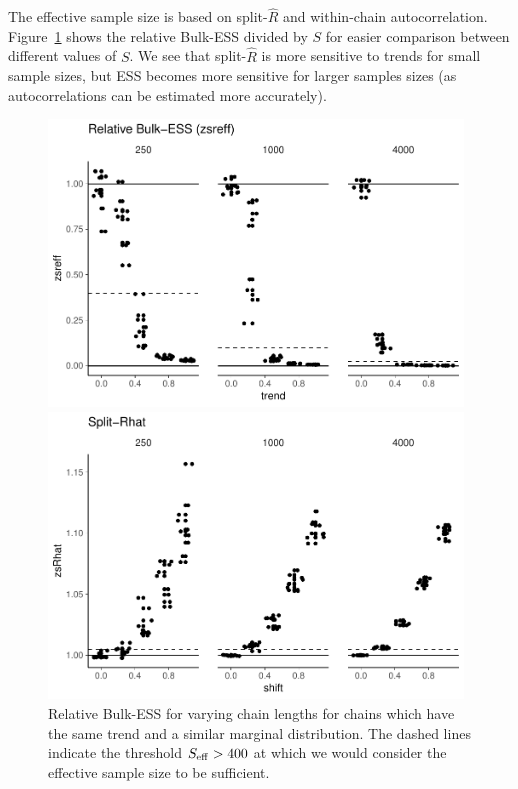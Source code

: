 \documentclass[american,]{article}
\theoremstyle{definition}
\begin{document}
The effective sample size is based on split-\(\widehat{R}\) and
within-chain autocorrelation. Figure~\ref{fig:zsreff-same-trend-1}
shows the relative Bulk-ESS divided by \(S\) for easier
comparison between different values of \(S\).
We see that split-\(\widehat{R}\) is more sensitive to trends for
small sample sizes, but ESS becomes more sensitive for larger samples
sizes (as autocorrelations can be estimated more accurately).
\begin{figure}[tp]
  \centering
  \begin{minipage}{0.48\textwidth}
  \includegraphics[width=0.98\textwidth]{graphics/zsreff-same-trend-1.pdf}
  \caption{Relative Bulk-ESS for varying chain lengths for chains which have
    the same trend and a similar marginal distribution. The dashed
    lines indicate the threshold \(S_{\rm eff} > 400\) at which we
    would consider the effective sample size to be sufficient.}
  \label{fig:zsreff-same-trend-1}
\end{minipage}
\hfill
  \begin{minipage}{0.48\textwidth}
  \includegraphics[width=0.98\textwidth]{graphics/zsrhat-shifted-chain-1.pdf}

\end{minipage}
\end{figure}
\end{document}

